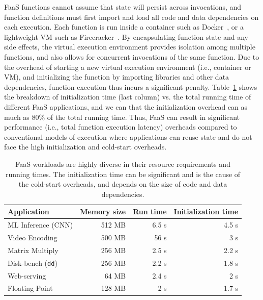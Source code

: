 

%
%
FaaS functions cannot assume that state will persist across invocations, and function definitions must first import and load all code and data dependencies on each execution. 
Each function is run inside a container such as Docker~\cite{docker-main}, or a lightweight VM such as Firecracker~\cite{firecracker-nsdi20}. 
By encapsulating function state and any side effects, the virtual execution environment provides isolation among multiple functions, and also allows for concurrent invocations of the same function. 
Due to the overhead of starting a new virtual execution environment (i.e., container or VM), and initializing the function by importing libraries and other data dependencies, function execution thus incurs a significant  penalty.
Table~\ref{tab:workloads} shows the breakdown of initialization time (last column) vs. the total running time of different FaaS applications, and we can that the initialization overhead can as much as 80\% of the total running time. 
Thus, FaaS can result in significant performance (i.e., total function execution latency) overheads compared to conventional models of execution where applications can reuse state and do not face the high initialization and cold-start overheads. 



\begin{table}
  \caption{FaaS workloads are highly diverse in their resource requirements and running times. The initialization time can be significant and is the cause of the cold-start overheads, and depends on the size of code and data dependencies.}
  \begin{tabular}{lrrr}
    \hline 
    Application & Memory size & Run time & Initialization time \\
    \hline
    ML Inference (CNN) & 512 MB & 6.5 s & 4.5 s \\
    Video Encoding & 500 MB & 56 s & 3 s \\
    Matrix Multiply & 256 MB & 2.5 s & 2.2 s \\
    Disk-bench (\texttt{dd})  & 256 MB & 2.2 s & 1.8 s \\
    Web-serving & 64 MB & 2.4 s & 2 s \\
    Floating Point & 128 MB & 2 s & 1.7 s \\

    \hline
  \end{tabular}
  \label{tab:workloads}
\end{table}



